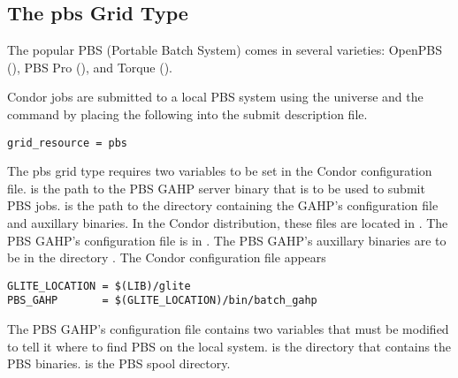 
\subsection{\label{sec:PBS}The pbs Grid Type }

The popular PBS (Portable Batch System) comes in
several varieties: OpenPBS (),
PBS Pro (), and
Torque
().

Condor jobs are submitted to a local PBS system
using the  universe and the
 command by placing the following
into the submit description file.
\begin{verbatim}
grid_resource = pbs
\end{verbatim}

The pbs grid type requires two variables to be set in the Condor
configuration file.
 is the path to the PBS GAHP server binary that is to be
used to submit PBS jobs.
 is the path to the directory containing the GAHP's
configuration file and auxillary binaries.
In the Condor distribution, these files are located in 
.
The PBS GAHP's configuration file is in
.
The PBS GAHP's auxillary binaries
are to be in the directory .
The Condor configuration file appears

\footnotesize
\begin{verbatim}
GLITE_LOCATION = $(LIB)/glite
PBS_GAHP       = $(GLITE_LOCATION)/bin/batch_gahp
\end{verbatim}
\normalsize

The PBS GAHP's configuration file contains two variables that must be
modified to tell it where to find PBS on the local system.
 is the directory that contains the PBS binaries.
 is the PBS spool directory.
